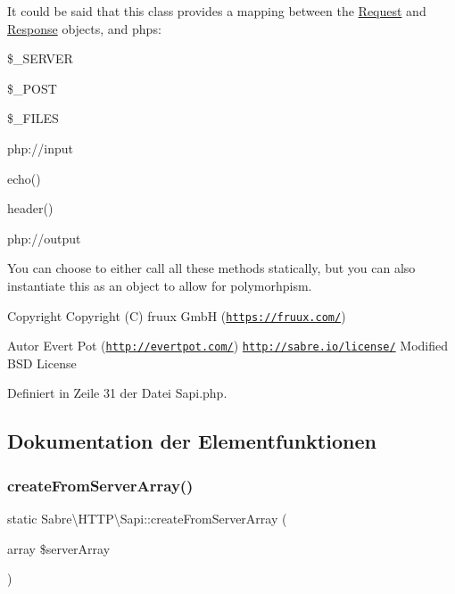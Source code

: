 It could be said that this class provides a mapping between the \mbox{\hyperlink{class_sabre_1_1_h_t_t_p_1_1_request}{Request}} and \mbox{\hyperlink{class_sabre_1_1_h_t_t_p_1_1_response}{Response}} objects, and php\textquotesingle{}s\+:


\begin{DoxyItemize}
\item \$\+\_\+\+S\+E\+R\+V\+ER
\item \$\+\_\+\+P\+O\+ST
\item \$\+\_\+\+F\+I\+L\+ES
\item php\+://input
\item echo()
\item header()
\item php\+://output
\end{DoxyItemize}

You can choose to either call all these methods statically, but you can also instantiate this as an object to allow for polymorhpism.

\begin{DoxyCopyright}{Copyright}
Copyright (C) fruux GmbH (\href{https://fruux.com/}{\tt https\+://fruux.\+com/}) 
\end{DoxyCopyright}
\begin{DoxyAuthor}{Autor}
Evert Pot (\href{http://evertpot.com/}{\tt http\+://evertpot.\+com/})  \href{http://sabre.io/license/}{\tt http\+://sabre.\+io/license/} Modified B\+SD License 
\end{DoxyAuthor}


Definiert in Zeile 31 der Datei Sapi.\+php.



\subsection{Dokumentation der Elementfunktionen}
\mbox{\label{class_sabre_1_1_h_t_t_p_1_1_sapi_a02a4fbdd30798f033220b6f04095c331}} 
\subsubsection{\texorpdfstring{create\+From\+Server\+Array()}{createFromServerArray()}}
{\footnotesize\ttfamily static Sabre\textbackslash{}\+H\+T\+T\+P\textbackslash{}\+Sapi\+::create\+From\+Server\+Array (\begin{DoxyParamCaption}\item[{array}]{\$server\+Array }\end{DoxyParamCaption})\hspace{0.3cm}{\ttfamily [static]}}

